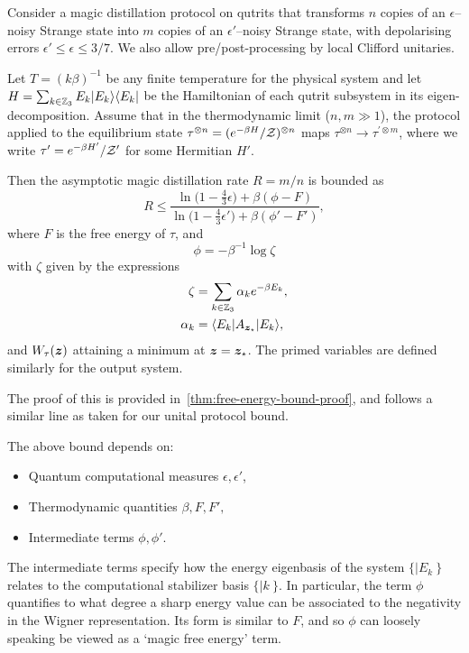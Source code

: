 \documentclass[pra,
aps,
twocolumn,
superscriptaddress,
groupedaddress,
nofootinbib,
reprint
]{revtex4-1}
\begin{document}
\begin{theorem}\label{thm:free-energy}
	Consider a magic distillation protocol on qutrits that transforms $n$ copies of an $\epsilon$--noisy Strange state into $m$ copies of an $\epsilon'$--noisy Strange state, with depolarising errors $\epsilon' \leq \epsilon \leq 3/7$. We also allow pre/post-processing by local Clifford unitaries.
	
	Let $T =(k\beta)^{-1}$ be any finite temperature for the physical system and let $H= \sum_{k \in \mathbb{Z}_3} E_k |E_k\rangle\langle E_k|$ be the Hamiltonian of each qutrit subsystem in its eigen-decomposition.
Assume that in the thermodynamic limit ($n,m \gg 1$), the protocol applied to the equilibrium state $\tau^{\otimes n} = (e^{-\beta H}/\mathcal{Z})^{\otimes n}$ maps $\tau^{\otimes n} \longrightarrow \tau^{\prime \otimes m}$, where we write $\tau' = e^{-\beta H'}/\mathcal{Z}'$ for some Hermitian $H'$.

Then the asymptotic magic distillation rate $R = m/n$ is bounded as
\begin{equation}\label{eq:rate_bounds_proof}
	R \leq \dfrac{\ln \big( 1-\frac{4}{3}\epsilon \big) + \beta (\phi - F)}{\ln \big( 1-\frac{4}{3}\epsilon' \big) + \beta (\phi' - F')},
\end{equation}
where $F$ is the free energy of $\tau$,  and 
\begin{equation}\label{eq:phi}
	\phi = -\beta^{-1} \log \zeta
\end{equation}
with $\zeta$ given by the expressions
\begin{align}
	\zeta &= \sum_{k\in \mathbb{Z}_3} \alpha_k e^{-\beta E_k}, \nonumber\\
	\alpha_k &= \langle E_k| A_{\bm{z}_\star} |E_k\rangle,
\end{align}
and $W_\tau(\bm{z})$ attaining a minimum at $\bm{z}=\bm{z}_\star$. The primed variables are defined similarly for the output system.
\end{theorem}
\noindent The proof of this is provided in~\cref{thm:free-energy-bound-proof}, and follows a similar line as taken for our unital protocol bound.

The above bound depends on: 
\begin{itemize}
\item Quantum computational measures $\epsilon, \epsilon'$,
\item Thermodynamic quantities $\beta, F, F',$
\item Intermediate terms $\phi, \phi'$. 
\end{itemize}
The intermediate terms specify how the energy eigenbasis of the system $\{|E_k\>\}$ relates to the computational stabilizer basis $\{|k\>\}$.  In particular, the term $\phi$ quantifies to what degree a sharp energy value can be associated to the negativity in the Wigner representation. Its form is similar to $F$, and so $\phi$ can loosely speaking be viewed as a `magic free energy' term. 
\end{document}
